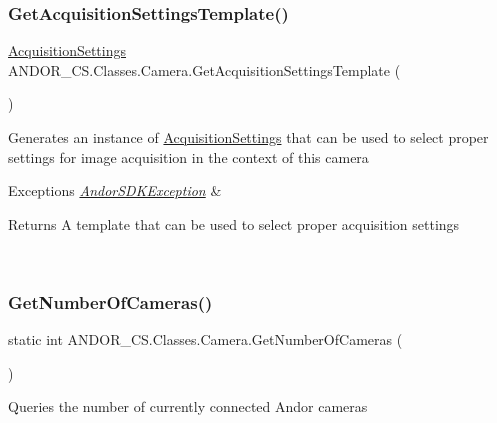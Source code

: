 \subsubsection{\texorpdfstring{Get\+Acquisition\+Settings\+Template()}{GetAcquisitionSettingsTemplate()}}
{\footnotesize\ttfamily \hyperlink{class_a_n_d_o_r___c_s_1_1_classes_1_1_acquisition_settings}{Acquisition\+Settings} A\+N\+D\+O\+R\+\_\+\+C\+S.\+Classes.\+Camera.\+Get\+Acquisition\+Settings\+Template (\begin{DoxyParamCaption}{ }\end{DoxyParamCaption})}



Generates an instance of \hyperlink{class_a_n_d_o_r___c_s_1_1_classes_1_1_acquisition_settings}{Acquisition\+Settings} that can be used to select proper settings for image acquisition in the context of this camera 


\begin{DoxyExceptions}{Exceptions}
{\em \hyperlink{class_a_n_d_o_r___c_s_1_1_andor_s_d_k_exception}{Andor\+S\+D\+K\+Exception}} & \begin{DoxyReturn}{Returns}
A template that can be used to select proper acquisition settings
\end{DoxyReturn}
\\
\hline
\end{DoxyExceptions}
\mbox{\label{class_a_n_d_o_r___c_s_1_1_classes_1_1_camera_aad5087de881575f5184615caf1fad61a}} 
\subsubsection{\texorpdfstring{Get\+Number\+Of\+Cameras()}{GetNumberOfCameras()}}
{\footnotesize\ttfamily static int A\+N\+D\+O\+R\+\_\+\+C\+S.\+Classes.\+Camera.\+Get\+Number\+Of\+Cameras (\begin{DoxyParamCaption}{ }\end{DoxyParamCaption})\hspace{0.3cm}{\ttfamily [static]}}



Queries the number of currently connected Andor cameras 


